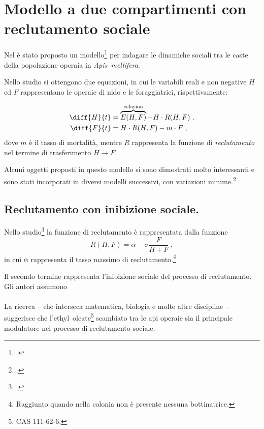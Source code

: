 \section[Modello a due compartimenti con reclutamento]{Modello a due compartimenti con reclutamento sociale}

Nel \citeyear{khoury2011} è stato proposto un modello\footcite{khoury2011} per indagare le dinamiche sociali
tra le caste della popolazione operaia in \emph{Apis~mellifera}.

Nello studio si ottengono due equazioni, in cui le variabili reali e non negative $H$ ed $F$ rappresentano
le operaie di nido e le foraggiatrici, rispettivamente:

\begin{align}
    \diff{H}{t} &= \overbrace{E(H,F)}^{\text{eclosion}}- H \cdot R(H,F) \label{eq:kh11h} \; , \\
    \diff{F}{t} &= H \cdot R(H,F)  - m \cdot F \label{eq:kh11f} \; ,
\end{align}
dove $m$ è il tasso di mortalità, mentre $R$ rappresenta la funzione di \emph{reclutamento} nel termine di
trasferimento $H \to F$.

Alcuni oggetti proposti in questo modello si sono dimostrati molto interessanti e sono stati incorporati
in diversi modelli successivi, con variazioni minime.\footcite{ratti2017}

\subsection{Reclutamento con inibizione sociale.}
Nello studio\footcite{khoury2011} la funzione di reclutamento è rappresentata dalla funzione
\begin{equation}
    \label{eq:Recr}
    R(H,F) = \alpha - \sigma \frac{F}{H+F} \; ,
\end{equation}
in cui $\alpha$ rappresenta il tasso massimo di reclutamento.\footnote{Raggiunto quando nella colonia non è
presente nessuna bottinatrice.}

Il secondo termine rappresenta l'inibizione sociale del processo di reclutamento.
Gli autori assumono

\paragraph{}
La ricerca -- che interseca matematica, biologia e molte altre discipline -- suggerisce che
l'ethyl~oleate\footnote{CAS 111-62-6.} %
scambiato tra le api operaie sia il principale modulatore nel processo di reclutamento sociale.

